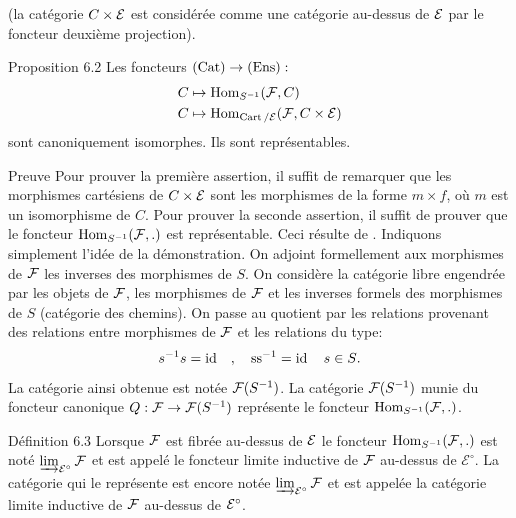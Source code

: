 \documentclass[10pt]{../fichiers-configuration-latex/smfart}
\begin{document}
(la catégorie $C\times {\mathcal E}$ est considérée comme une catégorie
au-dessus de ${\mathcal E}$ par le foncteur deuxième projection).

\begin{enonce*}{Proposition 6.2}
Les foncteurs $(\Cat) \to (\Ens) :$
\begin{align*}
C &\mapsto \operatorname{Hom}_{S^{-1}} ({\mathcal F}, C)\\
C &\mapsto \operatorname{Hom}_{\operatorname{Cart}/{\mathcal E}} ({\mathcal F}, C \times {\mathcal E})
\end{align*}
sont canoniquement isomorphes. Ils sont représentables.
\end{enonce*}

\begin{enonce*}[remark]{Preuve}
Pour prouver la première assertion, il
suffit de remarquer que les morphismes cartésiens de $C \times
{\mathcal E}$ sont les morphismes de la forme $m \times f$, où $m$ est
un isomorphisme de $C$. Pour prouver la seconde assertion, il suffit
de prouver que le foncteur $\operatorname{Hom}_{S^{-1}} ({\mathcal F}, .)$ est
représentable. Ceci résulte de \cite{SGA4-06:1}. Indiquons simplement l'idée de la
démonstration. On adjoint formellement aux morphismes de ${\mathcal F}$
les inverses des morphismes de $S$. On considère la catégorie libre
engendrée par les objets de ${\mathcal F}$, les morphismes de
${\mathcal F}$ et les inverses formels des morphismes de $S$ (catégorie des chemins). On passe au quotient
par les relations provenant des relations entre morphismes de
${\mathcal F}$ et les relations du type:
$$
s^{-1} s = \operatorname{id}\quad,\quad \text{ss}^{-1} = \operatorname{id}\quad  s \in S{}.
$$
La catégorie ainsi obtenue est notée ${\mathcal F}(S^{-1})$. La catégorie ${\mathcal F}(S^{-1})$ munie du foncteur
canonique $Q : \Ff \to \Ff(S^{-1})$ représente le foncteur
$\operatorname{Hom}_{S^{-1}} ({\mathcal F}, .)$.
\end{enonce*}

\begin{enonce*}{Définition 6.3}
Lorsque ${\mathcal F}$ est fibrée au-dessus de ${\mathcal E}$ le
foncteur $\operatorname{Hom}_{S^{-1}} ({\mathcal F}, .)$ est noté
$\varinjlim_{\mathcal{E}^{\circ}} {\mathcal F}$
et est appelé le foncteur limite inductive de ${\mathcal F}$ au-dessus
de $\mathcal{E}^{\circ}$. La catégorie qui le représente est encore
notée $\varinjlim_{\mathcal{E}^{\circ}}
{\mathcal F}$ et est appelée la catégorie limite inductive de
${\mathcal F}$ au-dessus de ${\mathcal E}^{\circ}$.
\end{enonce*}

\setcounter{subsection}{4}
\setcounter{subsubsection}{-1}
\subsubsection{}
\end{document}
